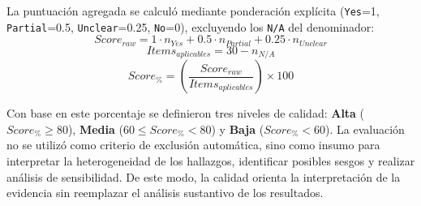 La puntuación agregada se calculó mediante ponderación explícita (\texttt{Yes}=1, \texttt{Partial}=0.5, \texttt{Unclear}=0.25, \texttt{No}=0), excluyendo los \texttt{N/A} del denominador:
\begin{equation}
\textit{Score}_{raw} = 1\cdot n_{Yes} + 0.5\cdot n_{Partial} + 0.25\cdot n_{Unclear}
\end{equation}
\begin{equation}
\textit{Items}_{aplicables} = 30 - n_{N/A}
\end{equation}
\begin{equation}
\textit{Score}_{\%} = \left( \frac{\textit{Score}_{raw}}{\textit{Items}_{aplicables}} \right)\times 100
\end{equation}

Con base en este porcentaje se definieron tres niveles de calidad: \textbf{Alta} (\(\textit{Score}_{\%}\geq 80\)), \textbf{Media} (\(60 \leq \textit{Score}_{\%} < 80\)) y \textbf{Baja} (\(\textit{Score}_{\%}<60\)). La evaluación no se utilizó como criterio de exclusión automática, sino como insumo para interpretar la heterogeneidad de los hallazgos, identificar posibles sesgos y realizar análisis de sensibilidad. De este modo, la calidad orienta la interpretación de la evidencia sin reemplazar el análisis sustantivo de los resultados.

